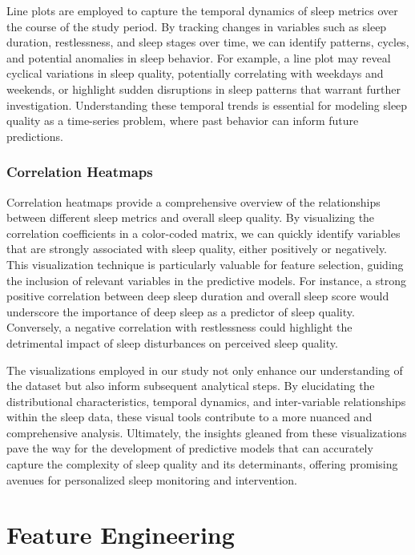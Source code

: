 \documentclass[10pt]{extarticle}
\begin{document}
Line plots are employed to capture the temporal dynamics of sleep metrics over the course of the study period. By tracking changes in variables such as sleep duration, restlessness, and sleep stages over time, we can identify patterns, cycles, and potential anomalies in sleep behavior. For example, a line plot may reveal cyclical variations in sleep quality, potentially correlating with weekdays and weekends, or highlight sudden disruptions in sleep patterns that warrant further investigation. Understanding these temporal trends is essential for modeling sleep quality as a time-series problem, where past behavior can inform future predictions.

\subsubsection{Correlation Heatmaps}

Correlation heatmaps provide a comprehensive overview of the relationships between different sleep metrics and overall sleep quality. By visualizing the correlation coefficients in a color-coded matrix, we can quickly identify variables that are strongly associated with sleep quality, either positively or negatively. This visualization technique is particularly valuable for feature selection, guiding the inclusion of relevant variables in the predictive models. For instance, a strong positive correlation between deep sleep duration and overall sleep score would underscore the importance of deep sleep as a predictor of sleep quality. Conversely, a negative correlation with restlessness could highlight the detrimental impact of sleep disturbances on perceived sleep quality.

The visualizations employed in our study not only enhance our understanding of the dataset but also inform subsequent analytical steps. By elucidating the distributional characteristics, temporal dynamics, and inter-variable relationships within the sleep data, these visual tools contribute to a more nuanced and comprehensive analysis. Ultimately, the insights gleaned from these visualizations pave the way for the development of predictive models that can accurately capture the complexity of sleep quality and its determinants, offering promising avenues for personalized sleep monitoring and intervention.

\section{Feature Engineering}
\end{document}

